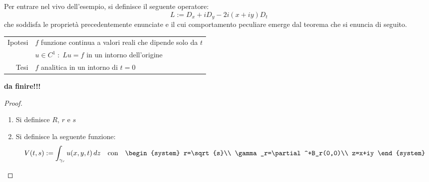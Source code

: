 \begin{example}
Per entrare nel vivo dell'esempio, si definisce il seguente operatore:
$$L:=D_x+iD_y-2i(x+iy)D_t$$
che soddisfa le proprietà precedentemente enunciate e il cui comportamento peculiare emerge dal teorema che si enuncia di seguito.
\begin{theorem}
\begin{tabular}{r|l}
Ipotesi & $f$ funzione continua a valori reali che dipende solo da $t$\\
&$u\in C^1\;:\;Lu=f$ in un intorno dell'origine\\
Tesi & $f$ analitica in un intorno di $t=0$
\end{tabular}
\end{theorem}
\textbf{da finire!!!}
\begin{proof}
\begin{enumerate}[1.]
\item
Si definisce $R$, $r$ e $s$
\item
Si definisce la seguente funzione: 
\begin{equation*}
V(t,s):=\int_{\gamma_r}u(x,y,t) \, dz \quad \text{con} \quad
\begin{system}
r=\sqrt{s}\\
\gamma_r=\partial^+B_r(0,0)\\
z=x+iy
\end{system}
\end{equation*}



\end{enumerate}
\end{proof}
\end{example}

